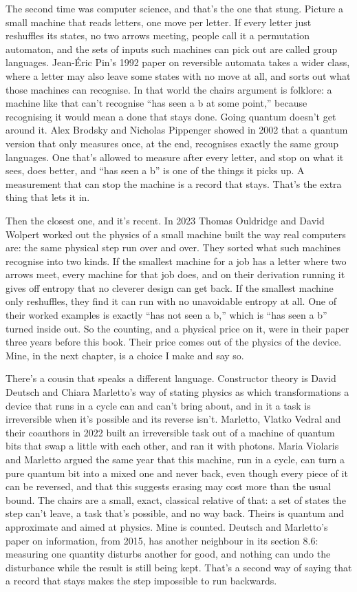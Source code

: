 \documentclass[11pt,twoside]{article}
\theoremstyle{thielethm}
\theoremstyle{thieledef}
\theoremstyle{thieledef}
\theoremstyle{thieledef}
\theoremstyle{thielethm}
\theoremstyle{thieleobs}
\theoremstyle{thielethm}
\begin{document}
The second time was computer science, and that's the one that stung. Picture a small machine that reads letters, one move per letter. If every letter just reshuffles its states, no two arrows meeting, people call it a permutation automaton, and the sets of inputs such machines can pick out are called group languages. Jean-Éric Pin's 1992 paper on reversible automata takes a wider class, where a letter may also leave some states with no move at all, and sorts out what those machines can recognise. In that world the chairs argument is folklore: a machine like that can't recognise ``has seen a b at some point,'' because recognising it would mean a done that stays done. Going quantum doesn't get around it. Alex Brodsky and Nicholas Pippenger showed in 2002 that a quantum version that only measures once, at the end, recognises exactly the same group languages. One that's allowed to measure after every letter, and stop on what it sees, does better, and ``has seen a b'' is one of the things it picks up. A measurement that can stop the machine is a record that stays. That's the extra thing that lets it in.

Then the closest one, and it's recent. In 2023 Thomas Ouldridge and David Wolpert worked out the physics of a small machine built the way real computers are: the same physical step run over and over. They sorted what such machines recognise into two kinds. If the smallest machine for a job has a letter where two arrows meet, every machine for that job does, and on their derivation running it gives off entropy that no cleverer design can get back. If the smallest machine only reshuffles, they find it can run with no unavoidable entropy at all. One of their worked examples is exactly ``has not seen a b,'' which is ``has seen a b'' turned inside out. So the counting, and a physical price on it, were in their paper three years before this book. Their price comes out of the physics of the device. Mine, in the next chapter, is a choice I make and say so.

There's a cousin that speaks a different language. Constructor theory is David Deutsch and Chiara Marletto's way of stating physics as which transformations a device that runs in a cycle can and can't bring about, and in it a task is irreversible when it's possible and its reverse isn't. Marletto, Vlatko Vedral and their coauthors in 2022 built an irreversible task out of a machine of quantum bits that swap a little with each other, and ran it with photons. Maria Violaris and Marletto argued the same year that this machine, run in a cycle, can turn a pure quantum bit into a mixed one and never back, even though every piece of it can be reversed, and that this suggests erasing may cost more than the usual bound. The chairs are a small, exact, classical relative of that: a set of states the step can't leave, a task that's possible, and no way back. Theirs is quantum and approximate and aimed at physics. Mine is counted. Deutsch and Marletto's paper on information, from 2015, has another neighbour in its section 8.6: measuring one quantity disturbs another for good, and nothing can undo the disturbance while the result is still being kept. That's a second way of saying that a record that stays makes the step impossible to run backwards.
\end{document}
